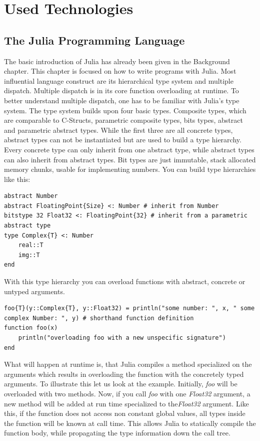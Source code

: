 \section{Used Technologies}

\subsection{The Julia Programming Language}

The basic introduction of Julia has already been given in the Background chapter.
This chapter is focused on how to write programs with Julia.
Most influential language construct are its hierarchical type system and multiple dispatch.
Multiple dispatch is in its core function overloading at runtime. 
To better understand multiple dispatch, one has to be familiar with Julia's type system.
The type system builds upon four basic types. 
Composite types, which are comparable to C-Structs, parametric composite types, bits types, abstract and parametric abstract types.
While the first three are all concrete types, abstract types can not be instantiated but are used to build a type hierarchy.
Every concrete type can only inherit from one abstract type, while abstract types can also inherit from abstract types.
Bit types are just immutable, stack allocated memory chunks, usable for implementing numbers.
You can build type hierarchies like this:
\begin{lstlisting}
abstract Number
abstract FloatingPoint{Size} <: Number # inherit from Number
bitstype 32 Float32 <: FloatingPoint{32} # inherit from a parametric abstract type
type Complex{T} <: Number
    real::T
    img::T
end
\end{lstlisting}

With this type hierarchy you can overload functions with abstract, concrete or untyped arguments.

\begin{lstlisting}
foo{T}(y::Complex{T}, y::Float32) = println("some number: ", x, " some complex Number: ", y) # shorthand function definition
function foo(x)
    println("overloading foo with a new unspecific signature")
end
\end{lstlisting}

What will happen at runtime is, that Julia compiles a method specialized on the arguments which results in overloading the function with the concretely typed arguments.
To illustrate this let us look at the example. 
Initially, \textit{foo} will be overloaded with two methods.
Now, if you call \textit{foo} with one \textit{Float32} argument, a new method will be added at run time specialized to the\textit{Float32} argument.
Like this, if the function does not access non constant global values, all types inside the function will be known at call time.
This allows Julia to statically compile the function body, while propagating the type information down the call tree.


